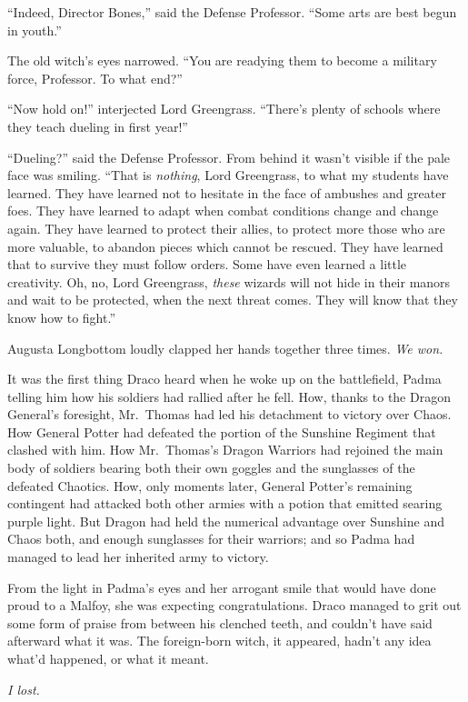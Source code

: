 “Indeed, Director Bones,” said the Defense Professor. “Some arts
are best begun in youth.”

The old witch’s eyes narrowed. “You are readying them to become
a military force, Professor. To what end?”

“Now hold on!” interjected Lord Greengrass. “There’s plenty of
schools where they teach dueling in first year!”

“Dueling?” said the Defense Professor. From behind it wasn’t
visible if the pale face was smiling. “That is \emph{nothing}, Lord
Greengrass, to what my students have learned. They have learned not
to hesitate in the face of ambushes and greater foes. They have
learned to adapt when combat conditions change and change again.
They have learned to protect their allies, to protect more those
who are more valuable, to abandon pieces which cannot be rescued.
They have learned that to survive they must follow orders. Some
have even learned a little creativity. Oh, no, Lord Greengrass,
\emph{these} wizards will not hide in their manors and wait to be
protected, when the next threat comes. They will know that they
know how to fight.”

Augusta Longbottom loudly clapped her hands together three
times.
\sbreak
\emph{We won.}

It was the first thing Draco heard when he woke up on the
battlefield, Padma telling him how his soldiers had rallied after
he fell. How, thanks to the Dragon General’s foresight, Mr.~Thomas
had led his detachment to victory over Chaos. How General Potter
had defeated the portion of the Sunshine Regiment that clashed with
him. How Mr.~Thomas’s Dragon Warriors had rejoined the main body of
soldiers bearing both their own goggles and the sunglasses of the
defeated Chaotics. How, only moments later, General Potter’s
remaining contingent had attacked both other armies with a potion
that emitted searing purple light. But Dragon had held the
numerical advantage over Sunshine and Chaos both, and enough
sunglasses for their warriors; and so Padma had managed to lead her
inherited army to victory.

From the light in Padma’s eyes and her arrogant smile that would
have done proud to a Malfoy, she was expecting congratulations.
Draco managed to grit out some form of praise from between his
clenched teeth, and couldn’t have said afterward what it was. The
foreign-born witch, it appeared, hadn’t any idea what’d happened,
or what it meant.

\emph{I lost.}

